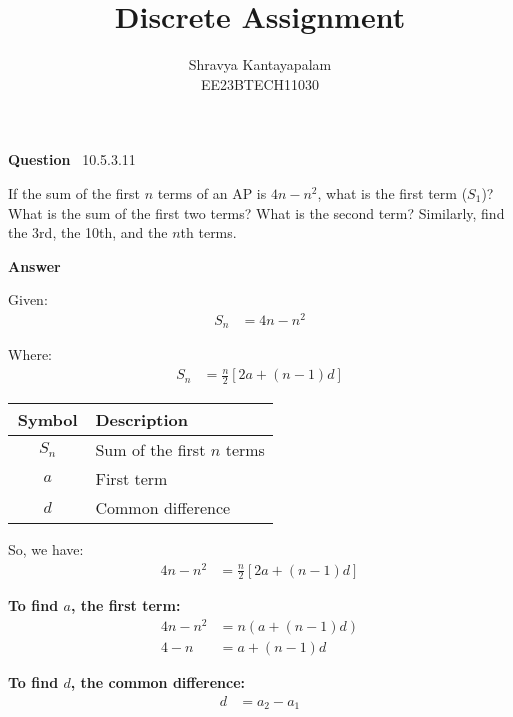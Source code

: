 \documentclass[journal,12pt,onecolumn]{IEEEtran}
\theoremstyle{remark}
\begin{document}
\let\vec\mathbf







\bigskip

\renewcommand{\thefigure}{\theenumi}
\renewcommand{\thetable}{\theenumi}


\title{Discrete Assignment}
\author{Shravya Kantayapalam\\ EE23BTECH11030}
\maketitle
\textbf{Question} \ 10.5.3.11\

 If the sum of the first \( n \) terms of an AP is \( 4n - n^2 \), what is the first term (\( S_1 \))? What is the sum of the first two terms? What is the second term? Similarly, find the 3rd, the 10th, and the \( n \)th terms.
 
\textbf{Answer}

Given:
\begin{align*}
S_n &= 4n - n^2
\end{align*}

Where:
\begin{align*}
S_n &= \frac{n}{2}[2a + (n-1)d]
\end{align*}

\begin{center}
\begin{tabular}{|c|p{0.7\linewidth}|}
\hline
Symbol & Description \\
\hline
$S_n$ & Sum of the first $n$ terms \\
$a$ & First term \\
$d$ & Common difference \\
\hline
\end{tabular}
\end{center}

So, we have:
\begin{align*}
4n - n^2 &= \frac{n}{2}[2a + (n-1)d]
\end{align*}

\textbf{To find \(a\), the first term:}
\begin{align*}
4n - n^2 &= n(a + (n-1)d) \\
4 - n &= a + (n-1)d
\end{align*}

\textbf{To find \(d\), the common difference:}
\begin{align*}
d &= a_2 - a_1
\end{align*}
\end{document}
